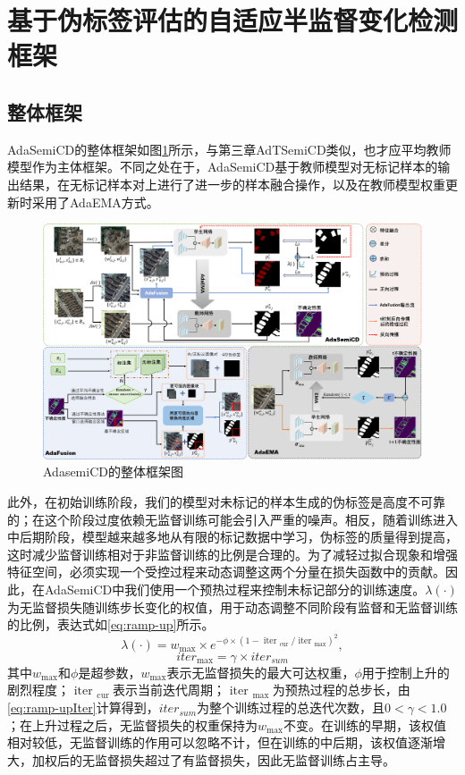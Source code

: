 \documentclass[lang=chs, degree=master, blindreview=false, adobe=false]{yanputhesis}
\begin{document}
\section{基于伪标签评估的自适应半监督变化检测框架}
\subsection{整体框架}
AdaSemiCD的整体框架如图\ref{fig:Ada_fram}所示，与第三章AdTSemiCD类似，也才应平均教师模型作为主体框架。不同之处在于，AdaSemiCD基于教师模型对无标记样本的输出结果，在无标记样本对上进行了进一步的样本融合操作，以及在教师模型权重更新时采用了AdaEMA方式。
\begin{figure}[!htbp]
  \centering
  \includegraphics[scale=0.35]{images/AdaFrame.png}
  \caption{
    AdasemiCD的整体框架图
  }
  \label{fig:Ada_fram}
\end{figure}

此外，在初始训练阶段，我们的模型对未标记的样本生成的伪标签是高度不可靠的；在这个阶段过度依赖无监督训练可能会引入严重的噪声。相反，随着训练进入中后期阶段，模型越来越多地从有限的标记数据中学习，伪标签的质量得到提高，这时减少监督训练相对于非监督训练的比例是合理的。为了减轻过拟合现象和增强特征空间，必须实现一个受控过程来动态调整这两个分量在损失函数中的贡献。因此，在AdaSemiCD中我们使用一个预热过程来控制未标记部分的训练速度。$\lambda(\cdot)$为无监督损失随训练步长变化的权值，用于动态调整不同阶段有监督和无监督训练的比例，表达式如\ref{eq:ramp-up}所示。
\begin{equation}
  \label{eq:ramp-up}
  \lambda(\cdot)=w_{\max } \times e^{-\phi \times\left(1-\text { iter }_{\text {cur }} / \text { iter }_{\max }\right)^{2}},
\end{equation}
\begin{equation}
  \label{eq:ramp-upIter}
  { iter }_{\max }=\gamma \times { iter }_{sum }
\end{equation}
其中$w_{\max }$和$\phi$是超参数，$w_{\max }$表示无监督损失的最大可达权重，$\phi$用于控制上升的剧烈程度；$\text { iter }_{\text {cur }}$表示当前迭代周期；$\text { iter }_{\text {max }}$为预热过程的总步长，由\ref{eq:ramp-upIter}计算得到，${ iter }_{sum }$为整个训练过程的总迭代次数，且$0<\gamma<1.0$；在上升过程之后，无监督损失的权重保持为$w_{\max }$不变。在训练的早期，该权值相对较低，无监督训练的作用可以忽略不计，但在训练的中后期，该权值逐渐增大，加权后的无监督损失超过了有监督损失，因此无监督训练占主导。
\end{document}
